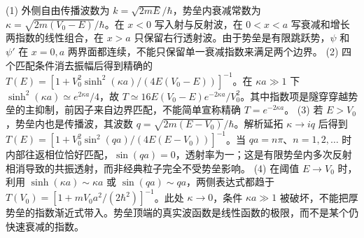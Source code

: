 (1) 外侧自由传播波数为 \(k=\sqrt{2mE}/\hbar\)，势垒内衰减常数为 \(\kappa=\sqrt{2m(V_0-E)}/\hbar\)。在 \(x<0\) 写入射与反射波，在 \(0<x<a\) 写衰减和增长两指数的线性组合，在 \(x>a\) 只保留右行透射波。由于势垒是有限跳跃势，\(\psi\) 和 \(\psi'\) 在 \(x=0,a\) 两界面都连续，不能只保留单一衰减指数来满足两个边界。
(2) 四个匹配条件消去振幅后得到精确的 \(T(E)=[1+V_0^2\sinh^2(\kappa a)/(4E(V_0-E))]^{-1}\)。在 \(\kappa a\gg1\) 下 \(\sinh^2(\kappa a)\simeq e^{2\kappa a}/4\)，故 \(T\simeq16E(V_0-E)e^{-2\kappa a}/V_0^2\)。其中指数项是隧穿穿越势垒的主抑制，前因子来自边界匹配，不能简单宣称精确 \(T=e^{-2\kappa a}\)。
(3) 若 \(E>V_0\)，势垒内也是传播波，其波数 \(q=\sqrt{2m(E-V_0)}/\hbar\)。解析延拓 \(\kappa\to iq\) 后得到 \(T(E)=[1+V_0^2\sin^2(qa)/(4E(E-V_0))]^{-1}\)。当 \(qa=n\pi\)、\(n=1,2,\ldots\) 时内部往返相位恰好匹配，\(\sin(qa)=0\)，透射率为一；这是有限势垒内多次反射相消导致的共振透射，而非经典粒子完全不受势垒影响。
(4) 在阈值 \(E\to V_0\) 时，利用 \(\sinh(\kappa a)\sim\kappa a\) 或 \(\sin(qa)\sim qa\)，两侧表达式都趋于 \(T(V_0)=[1+mV_0a^2/(2\hbar^2)]^{-1}\)。此处 \(\kappa\to0\)，条件 \(\kappa a\gg1\) 被破坏，不能把厚势垒的指数渐近式带入。势垒顶端的真实波函数是线性函数的极限，而不是某个仍快速衰减的指数。
